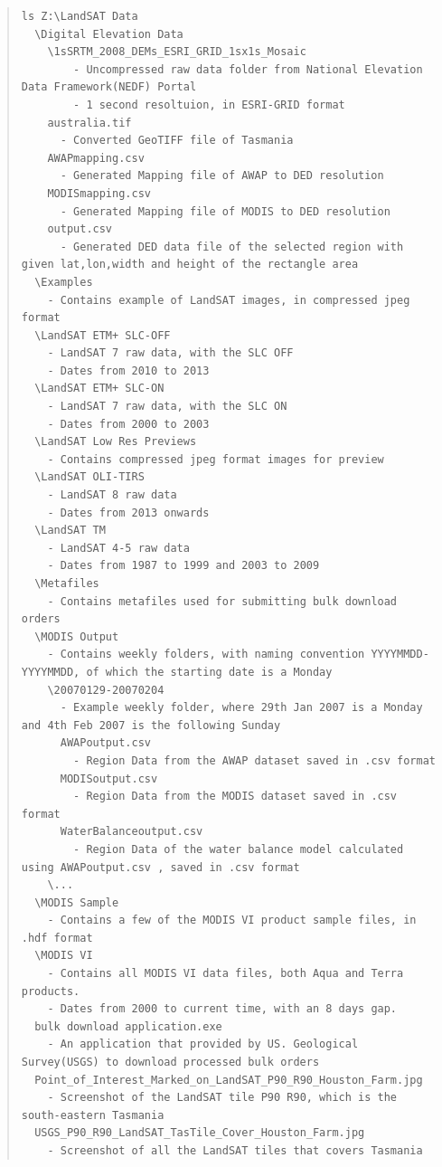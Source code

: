 \begin{quote}
\begin{lstlisting}  
ls Z:\LandSAT Data
  \Digital Elevation Data
    \1sSRTM_2008_DEMs_ESRI_GRID_1sx1s_Mosaic
        - Uncompressed raw data folder from National Elevation Data Framework(NEDF) Portal
        - 1 second resoltuion, in ESRI-GRID format
    australia.tif
      - Converted GeoTIFF file of Tasmania
    AWAPmapping.csv
      - Generated Mapping file of AWAP to DED resolution
    MODISmapping.csv
      - Generated Mapping file of MODIS to DED resolution
    output.csv
      - Generated DED data file of the selected region with given lat,lon,width and height of the rectangle area
  \Examples
    - Contains example of LandSAT images, in compressed jpeg format
  \LandSAT ETM+ SLC-OFF
    - LandSAT 7 raw data, with the SLC OFF
    - Dates from 2010 to 2013
  \LandSAT ETM+ SLC-ON
    - LandSAT 7 raw data, with the SLC ON
    - Dates from 2000 to 2003
  \LandSAT Low Res Previews
    - Contains compressed jpeg format images for preview
  \LandSAT OLI-TIRS
    - LandSAT 8 raw data
    - Dates from 2013 onwards
  \LandSAT TM
    - LandSAT 4-5 raw data
    - Dates from 1987 to 1999 and 2003 to 2009
  \Metafiles
    - Contains metafiles used for submitting bulk download orders
  \MODIS Output
    - Contains weekly folders, with naming convention YYYYMMDD-YYYYMMDD, of which the starting date is a Monday
    \20070129-20070204
      - Example weekly folder, where 29th Jan 2007 is a Monday and 4th Feb 2007 is the following Sunday
      AWAPoutput.csv
        - Region Data from the AWAP dataset saved in .csv format
      MODISoutput.csv
        - Region Data from the MODIS dataset saved in .csv format
      WaterBalanceoutput.csv
        - Region Data of the water balance model calculated using AWAPoutput.csv , saved in .csv format
    \...
  \MODIS Sample
    - Contains a few of the MODIS VI product sample files, in .hdf format
  \MODIS VI
    - Contains all MODIS VI data files, both Aqua and Terra products.
    - Dates from 2000 to current time, with an 8 days gap.
  bulk download application.exe
    - An application that provided by US. Geological Survey(USGS) to download processed bulk orders
  Point_of_Interest_Marked_on_LandSAT_P90_R90_Houston_Farm.jpg
    - Screenshot of the LandSAT tile P90 R90, which is the south-eastern Tasmania
  USGS_P90_R90_LandSAT_TasTile_Cover_Houston_Farm.jpg
    - Screenshot of all the LandSAT tiles that covers Tasmania
	\end{lstlisting}
\end{quote}
